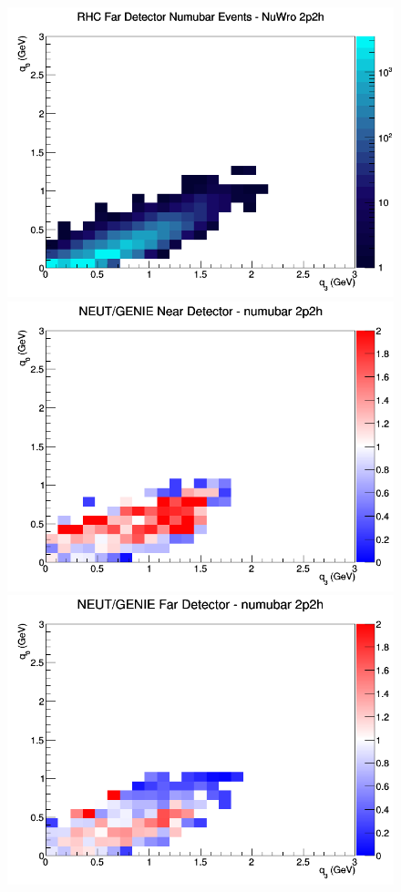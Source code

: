 \documentclass[12pt]{article}
\begin{document}
\begin{figure}[h]
\endminipage
{}
\includegraphics[width=\linewidth]{eff_q0_q3/GAr/2p2h_RHC_FD_numubar_q3_q0_NuWro.png}
\endminipage
\newline
{}
\includegraphics[width=\linewidth]{eff_q0_q3/GAr/ratios/2p2h_NEUT_GENIE_numubar_near_q3_q0.png}
\endminipage
{}
\includegraphics[width=\linewidth]{eff_q0_q3/GAr/ratios/2p2h_NEUT_GENIE_numubar_far_q3_q0.png}

\end{figure}
\end{document}
